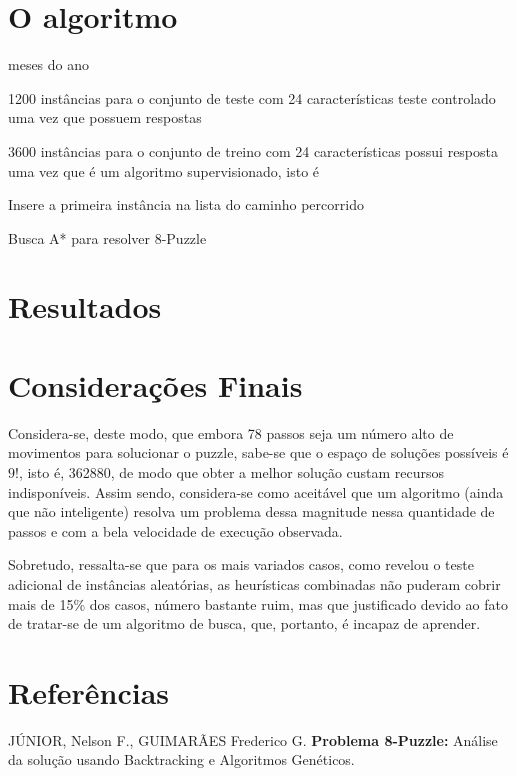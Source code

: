 \documentclass[12pt]{article}
\begin{document}
	\section{O algoritmo}\label{sec:algoritmo}


		meses do ano

		1200 instâncias para o conjunto de teste com 24 características
		teste controlado uma vez que possuem respostas

		3600 instâncias para o conjunto de treino com 24 características
		possui resposta uma vez que é um algoritmo supervisionado, isto é


		\begin{algorithm}[H]
			Insere a primeira instância na lista do caminho percorrido\;
			\caption{Busca A* para resolver 8-Puzzle}
		\end{algorithm}



	\section{Resultados}\label{sec:resultados}

	

	\section{Considerações Finais}\label{sec:consideracoesFinais}

		Considera-se, deste modo, que embora 78 passos seja um número alto de movimentos para solucionar o puzzle, sabe-se que o espaço de soluções possíveis é $9!$, isto é, 362880, de modo que obter a melhor solução custam recursos indisponíveis. Assim sendo, considera-se como aceitável que um algoritmo (ainda que não inteligente) resolva um problema dessa magnitude nessa quantidade de passos e com a bela velocidade de execução observada.

		Sobretudo, ressalta-se que para os mais variados casos, como revelou o teste adicional de instâncias aleatórias, as heurísticas combinadas não puderam cobrir mais de 15\% dos casos, número bastante ruim, mas que justificado devido ao fato de tratar-se de um algoritmo de busca, que, portanto, é incapaz de aprender.

	\section{Referências}\label{sec:referencias}

		JÚNIOR, Nelson F., GUIMARÃES Frederico G. \textbf{Problema 8-Puzzle:} Análise da solução usando Backtracking e Algoritmos Genéticos.
\end{document}
